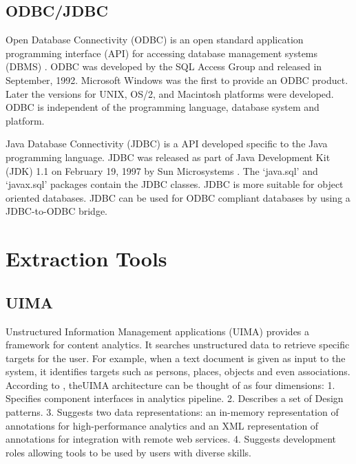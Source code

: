 \subsection{ODBC/JDBC}

     Open Database Connectivity (ODBC) is an open standard application
     programming interface (API) for accessing database management
     systems (DBMS) \cite{www-odbc}. ODBC was developed by the SQL
     Access Group and released in September, 1992. Microsoft Windows
     was the first to provide an ODBC product. Later the versions for
     UNIX, OS/2, and Macintosh platforms were developed. ODBC is
     independent of the programming language, database system and
     platform.

     Java Database Connectivity (JDBC) is a API developed specific to
     the Java programming language. JDBC was released as part of Java
     Development Kit (JDK) 1.1 on February 19, 1997 by Sun
     Microsystems \cite{www-jdbc}. The ‘java.sql’ and ‘javax.sql’
     packages contain the JDBC classes. JDBC is more suitable for
     object oriented databases. JDBC can be used for ODBC compliant
     databases by using a JDBC-to-ODBC bridge.

\section{Extraction Tools}
\label{S:o-Tools}


\subsection{UIMA}

     Unstructured Information Management applications (UIMA) provides
     a framework for content analytics. It searches unstructured data
     to retrieve specific targets for the user. For example, when a
     text document is given as input to the system, it identifies
     targets such as persons, places, objects and even
     associations. According to , \cite{www-wiki-uima} theUIMA
     architecture can be thought of as four dimensions: 1. Specifies
     component interfaces in analytics pipeline.  2. Describes a set
     of Design patterns. 3. Suggests two data representations: an
     in-memory representation of annotations for high-performance
     analytics and an XML representation of annotations for
     integration with remote web services. 4. Suggests development
     roles allowing tools to be used by users with diverse skills.


